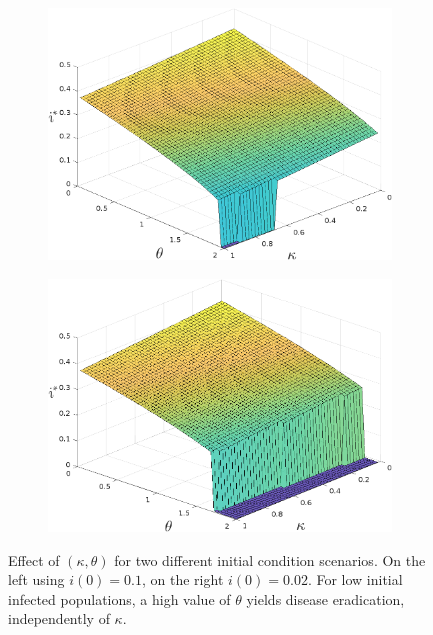 \documentclass[sn-basic]{sn-jnl}%
\theoremstyle{thmstyleone}%
\theoremstyle{thmstyletwo}%
\theoremstyle{thmstylethree}%
\begin{document}
\begin{figure}[H]
    \centering
    \begin{subfigure}[b]{0.45\textwidth}
    \includegraphics[scale=0.3]{img/Figure_4a.png}
    \end{subfigure}
    \begin{subfigure}[b]{0.45\textwidth}
    \includegraphics[scale=0.3]{img/Figure_4b.png}
    \end{subfigure}
    \caption{Effect of $(\kappa, \theta)$ for two different initial condition scenarios. On the left using $i(0)=0.1$, on the right $i(0)=0.02$. For low initial infected populations, a high value of $\theta$ yields disease eradication, independently of $\kappa$.}
    \label{kappa_theta_effect}
\end{figure}
\end{document}
